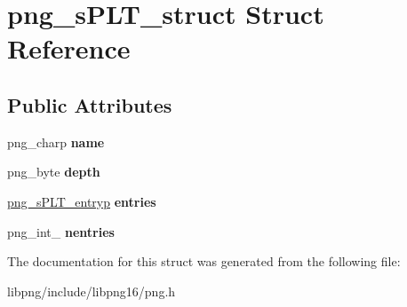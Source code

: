 \hypertarget{structpng__sPLT__struct}{\section{png\-\_\-s\-P\-L\-T\-\_\-struct Struct Reference}
\label{structpng__sPLT__struct}
}
\subsection*{Public Attributes}
\begin{DoxyCompactItemize}
\item 
\hypertarget{structpng__sPLT__struct_af3b088b149e790b9b98ebedde69a70f0}{png\-\_\-charp {\bfseries name}}\label{structpng__sPLT__struct_af3b088b149e790b9b98ebedde69a70f0}

\item 
\hypertarget{structpng__sPLT__struct_a6e667882cd16c9675455cebd49898b22}{png\-\_\-byte {\bfseries depth}}\label{structpng__sPLT__struct_a6e667882cd16c9675455cebd49898b22}

\item 
\hypertarget{structpng__sPLT__struct_a4c7db13fb1a7f0ede434e174b20151ec}{\hyperlink{structpng__sPLT__entry__struct}{png\-\_\-s\-P\-L\-T\-\_\-entryp} {\bfseries entries}}\label{structpng__sPLT__struct_a4c7db13fb1a7f0ede434e174b20151ec}

\item 
\hypertarget{structpng__sPLT__struct_ac5844e98e4c43733bad6b83b54dc7a9f}{png\-\_\-int\-\_ {\bfseries nentries}}\label{structpng__sPLT__struct_ac5844e98e4c43733bad6b83b54dc7a9f}

\end{DoxyCompactItemize}


The documentation for this struct was generated from the following file\-:\begin{DoxyCompactItemize}
\item 
libpng/include/libpng16/png.\-h\end{DoxyCompactItemize}
